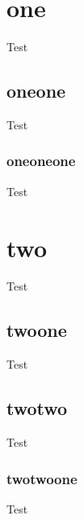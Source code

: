 \documentclass[a4paper, 11pt]{article}
\begin{document}
\tableofcontents

\section{one}
Test

\subsection{oneone}
Test

\subsubsection{oneoneone}
Test

\section{two}
Test

\subsection{twoone}
Test

\subsection{twotwo}
Test

\subsubsection{twotwoone}
Test
\end{document}
